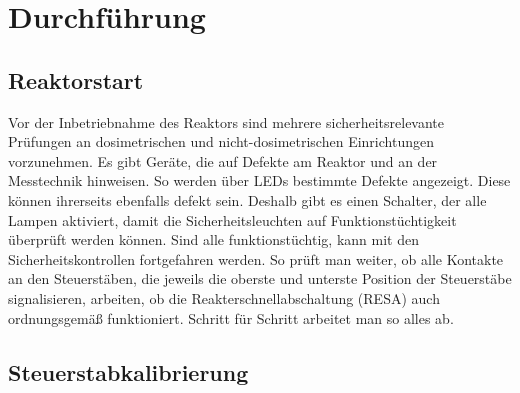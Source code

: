 \section{Durchführung}
    \subsection{Reaktorstart}
    Vor der Inbetriebnahme des Reaktors sind mehrere sicherheitsrelevante Prüfungen an dosimetrischen und nicht-dosimetrischen Einrichtungen vorzunehmen. Es gibt Geräte, die auf Defekte am Reaktor und an der Messtechnik hinweisen. So werden über LEDs bestimmte Defekte angezeigt. Diese können ihrerseits ebenfalls defekt sein. Deshalb gibt es einen Schalter, der alle Lampen aktiviert, damit die Sicherheitsleuchten auf Funktionstüchtigkeit überprüft werden können. Sind alle funktionstüchtig, kann mit den Sicherheitskontrollen fortgefahren werden.
    So prüft man weiter, ob alle Kontakte an den Steuerstäben, die jeweils die oberste und unterste Position der Steuerstäbe signalisieren, arbeiten, ob die Reakterschnellabschaltung (RESA) auch ordnungsgemäß funktioniert. Schritt für Schritt arbeitet man so alles ab.
    
    \subsection{Steuerstabkalibrierung}

